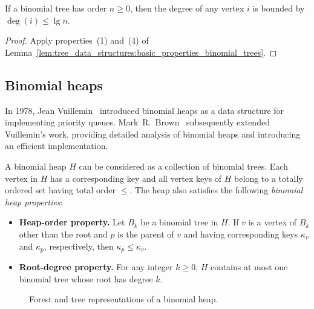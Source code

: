 \begin{corollary}
If a binomial tree has order $n \geq 0$, then the degree of any vertex
$i$ is bounded by $\deg(i) \leq \lg n$.
\end{corollary}

\begin{proof}
Apply properties~(1) and~(4) of
Lemma~\ref{lem:tree_data_structures:basic_properties_binomial_trees}.
\end{proof}



\subsection{Binomial heaps}

In 1978, Jean Vuillemin~\cite{Vuillemin1978}
introduced binomial heaps as a data structure for implementing
priority queues. Mark~R.~Brown~\cite{Brown1977,Brown1978} subsequently
extended Vuillemin's work, providing detailed analysis of binomial
heaps and introducing an efficient implementation.

A binomial heap $H$ can be considered as a
collection of binomial trees. Each vertex in $H$ has a corresponding
key and all vertex keys of $H$ belong to a totally ordered set having
total order $\leq$. The heap also satisfies the following
\emph{binomial heap properties}:
\begin{itemize}
\item \textbf{Heap-order property.}
  Let $B_k$ be a binomial tree in $H$. If $v$ is a vertex of $B_k$
  other than the root and $p$ is the parent of $v$ and having
  corresponding keys $\kappa_v$ and $\kappa_p$, respectively, then
  $\kappa_p \leq \kappa_v$.

\item \textbf{Root-degree property.}
  For any integer $k \geq 0$, $H$ contains at most one binomial tree
  whose root has degree $k$.
\end{itemize}

\begin{figure}[!htbp]
\centering

\caption{Forest and tree representations of a binomial heap.}
\label{fig:tree_data_structures:binomial_heap_forest_tree_representations}
\end{figure}

